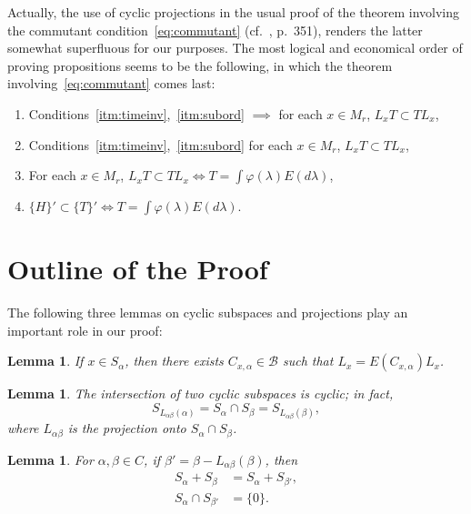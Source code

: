\documentclass[12pt]{article}
\newtheorem{lemma}[theorem]{Lemma}
\theoremstyle{definition}
\begin{document}
Actually, the use of cyclic projections in the usual proof of the theorem involving the commutant condition~\eqref{eq:commutant} (cf.~\cite{riesz1959}, p.~351), renders the latter somewhat superfluous for our purposes. The most logical and economical order of proving propositions seems to be the following, in which the theorem involving~\eqref{eq:commutant} comes last:
\begin{enumerate}[label=(\arabic*)]
    \item\label{enum:LtTLt} Conditions~\ref{itm:timeinv},~\ref{itm:subord} $\implies$ for each $x\in M_r$, $L_x T \subset T L_x$,
    \item\label{enum:LxTLx} Conditions~\ref{itm:timeinv},~\ref{itm:subord} for each $x\in M_r$, $L_x T \subset T L_x$,
    \item\label{enum:LxTiff} For each $x\in M_r$, $L_x T \subset T L_x \iff T = \int \varphi(\lambda) E(d\lambda)$,
    \item\label{enum:commutantiff} $\{H\}' \subset \{T\}' \iff T = \int \varphi(\lambda) E(d\lambda)$.
\end{enumerate}

\section{Outline of the Proof}

The following three lemmas on cyclic subspaces and projections play an important role in our proof:

\begin{lemma}\label{lem:cyclicproj}
If $x \in S_\alpha$, then there exists $C_{x,\alpha} \in \mathcal{B}$ such that $L_x = E(C_{x,\alpha}) L_x$.
\end{lemma}

\begin{lemma}\label{lem:cyclicintersection}
The intersection of two cyclic subspaces is cyclic; in fact,
\begin{equation}
S_{L_{\alpha\beta}(\alpha)} = S_\alpha \cap S_\beta = S_{L_{\alpha\beta}(\beta)},
\label{eq:cyclicintersection}
\end{equation}
where $L_{\alpha\beta}$ is the projection onto $S_\alpha \cap S_\beta$.
\end{lemma}

\begin{lemma}\label{lem:cyclicsum}
For $\alpha, \beta \in C$, if $\beta' = \beta - L_{\alpha\beta}(\beta)$, then
\begin{align}
S_\alpha + S_\beta &= S_\alpha + S_{\beta'}, \label{eq:cyclicsum1}\\
S_\alpha \cap S_{\beta'} &= \{0\}. \label{eq:cyclicsum2}
\end{align}
\end{lemma}
\end{document}
